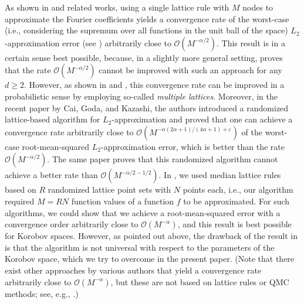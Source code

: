 \documentclass[a4paper,11pt]{article}
\begin{document}
As shown in \cite{kuo2006lattice} and related works, using a single lattice rule with $M$ nodes to approximate the Fourier coefficients yields a convergence rate of the worst-case (i.e., considering the supremum over all functions in the unit ball of the space) $L_2$-approximation error (see ) arbitrarily close to $\mathcal{O}(M^{-\alpha/2})$. This result is in a certain sense best possible, because, in a slightly more general setting, \cite{byrenheid2017tight} proves that the rate $\mathcal{O}(M^{-\alpha/2})$ cannot be improved with such an approach for any $d\ge 2$. However, as shown in \cite{kaemmerer2019constructing} and \cite{kammerer2019approximation}, this convergence rate can be improved in a probabilistic sense by employing so-called \textit{multiple lattices}. Moreover, in the recent paper \cite{CGK24} by Cai, Goda, and Kazashi, the authors introduced a randomized lattice-based algorithm for $L_2$-approximation and proved that one can achieve a convergence rate arbitrarily close to $\mathcal{O}(M^{-\alpha(2\alpha+1)/(4\alpha+1)+\varepsilon})$ of the worst-case root-mean-squared $L_2$-approximation error, which is better than the rate $\mathcal{O}(M^{-\alpha/2})$. The same paper proves that this randomized algorithm cannot achieve a better rate than $\mathcal{O}(M^{-\alpha/2 - 1/2})$. In \cite{PKG24}, we used median lattice rules based on 
$R$ randomized lattice point sets with $N$ points each, i.e., our algorithm required $M=RN$ function values of a function $f$ to be approximated. For such algorithms, we could show that we achieve 
a root-mean-squared error with a convergence order arbitrarily close to $\mathcal{O} (M^{-\alpha})$, and this result is best possible for Korobov spaces. However, as pointed out above, the drawback of the result in \cite{PKG24} is that the algorithm is not universal with respect to the parameters of the Korobov space, which we try to overcome in the present paper. (Note that there exist other approaches by various authors that yield a convergence rate arbitrarily close to $\mathcal{O} (M^{-\alpha})$, but these are not based on lattice rules or QMC methods; see, e.g., \cite{CM17, DC24, K19, WW07}.)
\end{document}
